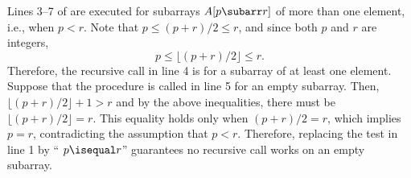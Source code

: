 
\noindent Lines 3--7 of  are executed for subarrays $A[p\subarr r]$ of more than one element, i.e., when $p<r$.
Note that $p\le(p+r)/2\le r$, and since both $p$ and $r$ are integers,
\[
    p \le \lfloor(p+r)/2\rfloor \le r.
\]
Therefore, the recursive call in line 4 is for a subarray of at least one element.
Suppose that the procedure is called in line 5 for an empty subarray.
Then, $\lfloor(p+r)/2\rfloor+1>r$ and by the above inequalities, there must be $\lfloor(p+r)/2\rfloor=r$.
This equality holds only when $(p+r)/2=r$, which implies $p=r$, contradicting the assumption that $p<r$.
Therefore, replacing the test in line 1 by `` $p\isequal r$'' guarantees no recursive call works on an empty subarray.
